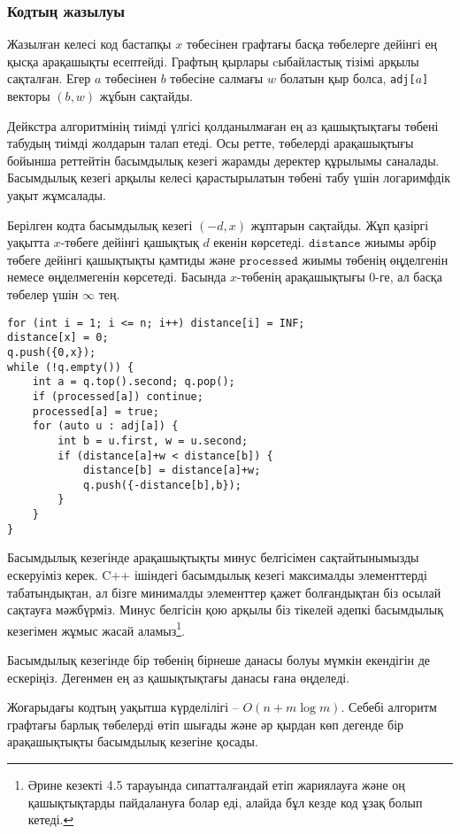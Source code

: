 \subsubsection{Кодтың жазылуы}

Жазылған келесі код бастапқы $x$ төбесінен графтағы
басқа төбелерге дейінгі ең қысқа арақашықты есептейді.
Графтың қырлары cыбайластық тізімі арқылы сақталған. 
Егер $a$ төбесінен $b$ төбесіне салмағы $w$ болатын қыр болса,
\texttt{adj[$a$]} векторы $(b,w)$ жұбын
сақтайды.

Дейкстра алгоритмінің тиімді үлгісі қолданылмаған
ең аз қашықтықтағы төбені табудың тиімді жолдарын талап етеді.
Осы ретте, төбелерді арақашықтығы бойынша
реттейтін басымдылық кезегі жарамды деректер құрылымы
саналады.
Басымдылық кезегі арқылы келесі қарастырылатын төбені
табу үшін логаримфдік уақыт жұмсалады.

Берілген кодта басымдылық кезегі $(-d,x)$ жұптарын сақтайды.
Жұп қазіргі уақытта $x$-төбеге дейінгі қашықтық $d$ екенін көрсетеді.
$\texttt{distance}$ жиымы әрбір төбеге дейінгі қашықтықты қамтиды және
$\texttt{processed}$ жиымы төбенің өңделгенін немесе
өңделмегенін көрсетеді.
Басында $x$-төбенің арақашықтығы $0$-ге, ал басқа төбелер үшін $\infty$ тең.

\begin{lstlisting}
for (int i = 1; i <= n; i++) distance[i] = INF;
distance[x] = 0;
q.push({0,x});
while (!q.empty()) {
    int a = q.top().second; q.pop();
    if (processed[a]) continue;
    processed[a] = true;
    for (auto u : adj[a]) {
        int b = u.first, w = u.second;
        if (distance[a]+w < distance[b]) {
            distance[b] = distance[a]+w;
            q.push({-distance[b],b});
        }
    }
}
\end{lstlisting}

Басымдылық кезегінде арақашықтықты минус белгісімен
сақтайтынымызды ескеруіміз керек. C++ ішіндегі 
басымдылық кезегі максималды элементтерді табатындықтан, ал бізге минималды элементтер қажет болғандықтан біз осылай сақтауға мәжбүрміз.
Минус белгісін қою арқылы біз тікелей әдепкі басымдылық
кезегімен жұмыс жасай аламыз\footnote{Әрине кезекті 4.5 тарауында сипатталғандай етіп жариялауға және оң қашықтықтарды пайдалануға болар еді, алайда бұл кезде код ұзақ болып кетеді.}.

Басымдылық кезегінде бір төбенің бірнеше данасы
болуы мүмкін екендігін де ескеріңіз. Дегенмен ең аз қашықтықтағы данасы ғана өңделеді.

Жоғарыдағы кодтың уақытша күрделілігі -- $O(n+m \log m)$.
Себебі алгоритм графтағы барлық төбелерді өтіп шығады және 
әр қырдан көп дегенде бір арақашықтықты басымдылық кезегіне қосады.

